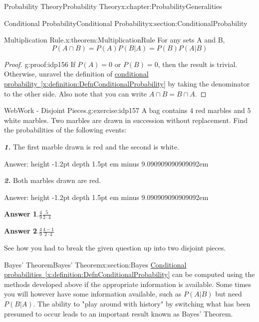 \documentclass[oneside,10pt,]{book}
\newcommand{\blocktitlefont}{\relax}
\newcommand{\xreffont}{\relax}
\newcommand{\alert}[1]{\textbf{\textit{#1}}}
\newcommand{\fillin}[1]{\leavevmode\leaders\vrule height -1.2pt depth 1.5pt \hskip #1em minus #1em \null}
\numberwithin{equation}{section}
\begin{document}
\begin{chapterptx}{Probability Theory}{}{Probability Theory}{}{}{x:chapter:ProbabilityGeneralities}
\begin{sectionptx}{Conditional Probability}{}{Conditional Probability}{}{}{x:section:ConditionalProbability}
\begin{theorem}{Multiplication Rule.}{}{x:theorem:MultiplicationRule}
For any sets A and B,%
\begin{equation*}
P(A \cap B) = P(A) P(B | A) = P(B) P(A | B)
\end{equation*}
%
\end{theorem}
\begin{proof}{}{g:proof:idp156}
If \(P(A)=0\) or \(P(B)=0\), then the result is trivial. Otherwise, unravel the definition of \hyperref[x:definition:DefnConditionalProbability]{conditional probability~{\xreffont\ref{x:definition:DefnConditionalProbability}}} by taking the denominator to the other side. Also note that you can write \(A \cap B = B \cap A\).%
\end{proof}
\begin{inlineexercise}{WebWork - Disjoint Pieces.}{g:exercise:idp157}%
A bag contains \(4\) red marbles and \(5\) white marbles.  Two marbles are drawn in succession without replacement.  Find the probabilities of the following events:%
\par
\alert{1.} The first marble drawn is red and the second is white.%
\par
Answer: \fillin{9.090909090909092}%
\par
\alert{2.} Both marbles drawn are red.%
\par
Answer: \fillin{9.090909090909092}%
\par\smallskip%
\noindent\textbf{\blocktitlefont Answer 1}.\hypertarget{g:answer:idp158}{}\quad{}\(\frac{4}{9}\frac{5}{2\cdot 4}\)%
\par\smallskip%
\noindent\textbf{\blocktitlefont Answer 2}.\hypertarget{g:answer:idp159}{}\quad{}\(\frac{4}{9}\frac{4-1}{2\cdot 4}\)%
\par\medskip\noindent See how you had to break the given question up into two disjoint pieces.%
\par
\end{inlineexercise}%
\end{sectionptx}
%
%
\typeout{************************************************}
\typeout{************************************************}
%
\begin{sectionptx}{Bayes' Theorem}{}{Bayes' Theorem}{}{}{x:section:Bayes}
\hyperref[x:definition:DefnConditionalProbability]{Conditional probabilities~{\xreffont\ref{x:definition:DefnConditionalProbability}}} can be computed using the methods developed above if the appropriate information is available. Some times you will however have some information available, such as \(P(A | B)\) but need \(P(B | A)\). The ability to "play around with history" by switching what has been presumed to occur leads to an important result known as Bayes' Theorem.%

\end{sectionptx}
\end{chapterptx}
\end{document}
